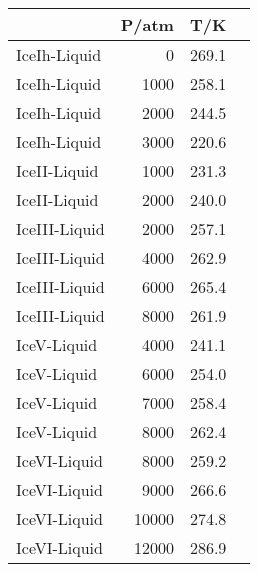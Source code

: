 \begin{tabular}{lrrl}
\hline\hline
&P/atm&T/K\\
\hline
IceIh-Liquid&0&269.1\\
IceIh-Liquid&1000&258.1\\
IceIh-Liquid&2000&244.5\\
IceIh-Liquid&3000&220.6\\
\hline
IceII-Liquid&1000&231.3\\
IceII-Liquid&2000&240.0\\
\hline
IceIII-Liquid&2000&257.1\\
IceIII-Liquid&4000&262.9\\
IceIII-Liquid&6000&265.4\\
IceIII-Liquid&8000&261.9\\
\hline
IceV-Liquid&4000&241.1\\
IceV-Liquid&6000&254.0\\
IceV-Liquid&7000&258.4\\
IceV-Liquid&8000&262.4\\
\hline
IceVI-Liquid&8000&259.2\\
IceVI-Liquid&9000&266.6\\
IceVI-Liquid&10000&274.8\\
IceVI-Liquid&12000&286.9\\
\hline
\hline\hline
\end{tabular}
